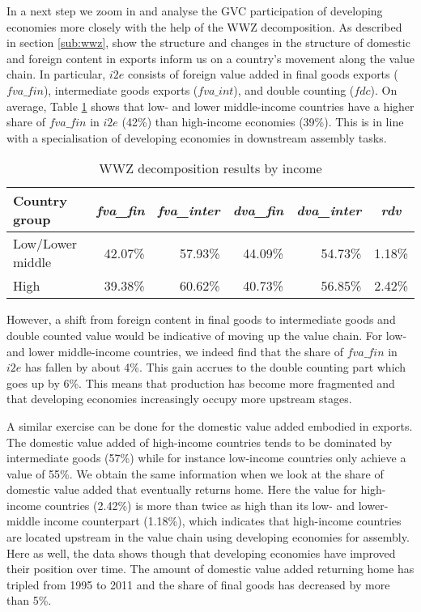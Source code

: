 \documentclass[11pt,a4paper]{article}
\begin{document}

In a next step we zoom in and analyse the GVC participation of developing economies more closely with the help of the WWZ decomposition. As described in section \ref{sub:wwz}, \citet{zhwaetal13} show the structure and changes in the structure of domestic and foreign content in exports inform us on a country's movement along the value chain. In particular, $i2e$ consists of foreign value added in final goods exports ($fva\_fin$), intermediate goods exports ($fva\_int$), and double counting ($fdc$). On average, Table \ref{tab:wwz} shows that low- and lower middle-income countries have a higher share of $fva\_fin$ in $i2e$ (42\%) than high-income economies (39\%). This is in line with a specialisation of developing economies in downstream assembly tasks.

\begin{table}[htbp]\small
  \centering
  \caption{WWZ decomposition results by income}
    \begin{tabular}{lrrrrr}
    \toprule
    Country group & \multicolumn{1}{c}{\textit{fva\_fin}} & \multicolumn{1}{c}{\textit{fva\_inter}} & \multicolumn{1}{c}{\textit{dva\_fin}} & \multicolumn{1}{c}{\textit{dva\_inter}} & \multicolumn{1}{c}{\textit{rdv}} \\
    \midrule
    Low/Lower middle & 42.07\% & 57.93\% & 44.09\% & 54.73\% & 1.18\% \\
    High  & 39.38\% & 60.62\% & 40.73\% & 56.85\% & 2.42\% \\
    \bottomrule
    \end{tabular}
  \label{tab:wwz}
\end{table}

However, a shift from foreign content in final goods to intermediate goods and double counted value would be indicative of moving up the value chain. For low- and lower middle-income countries, we indeed find that the share of $fva\_fin$ in $i2e$ has fallen by about 4\%. This gain accrues to the double counting part which goes up by 6\%. This means that production has become more fragmented and that developing economies increasingly occupy more upstream stages.

A similar exercise can be done for the domestic value added embodied in exports. The domestic value added of high-income countries tends to be dominated by intermediate goods (57\%) while for instance low-income countries only achieve a value of 55\%. We obtain the same information when we look at the share of domestic value added that eventually returns home. Here the value for high-income countries (2.42\%) is more than twice as high than its low- and lower-middle income counterpart (1.18\%), which indicates that high-income countries are located upstream in the value chain using developing economies for assembly. Here as well, the data shows though that developing economies have improved their position over time. The amount of domestic value added returning home has tripled from 1995 to 2011 and the share of final goods has decreased by more than 5\%. 
\end{document}
